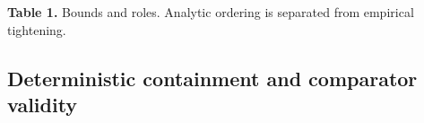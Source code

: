 \documentclass{article}
\begin{document}
{\begin{table}[ht]
\centering
\caption{Comparison of Bound or control across Exact definition, Role}
\label{tab:1}
\end{table}

\textbf{Table 1.} Bounds and roles. Analytic ordering is separated from empirical tightening.

\subsection{Deterministic containment and comparator validity}

\label{sec:deterministic\_containment\_and\_comparator}

}
\end{document}
